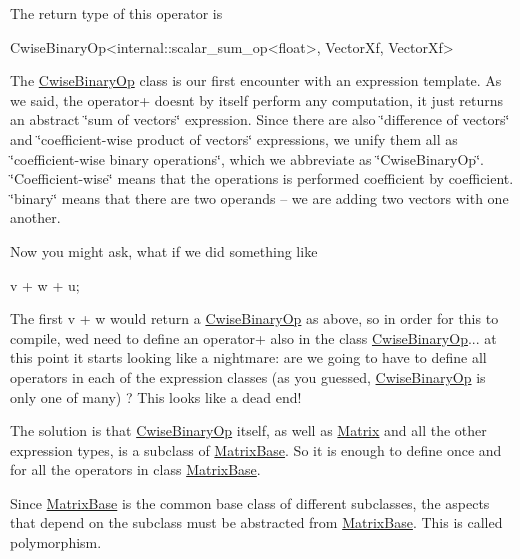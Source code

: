 The return type of this operator is 
\begin{DoxyCode}
CwiseBinaryOp<internal::scalar\_sum\_op<float>, VectorXf, VectorXf>
\end{DoxyCode}
 The \hyperlink{group___core___module_class_eigen_1_1_cwise_binary_op}{Cwise\+Binary\+Op} class is our first encounter with an expression template. As we said, the operator+ doesn\textquotesingle{}t by itself perform any computation, it just returns an abstract \char`\"{}sum of vectors\char`\"{} expression. Since there are also \char`\"{}difference of vectors\char`\"{} and \char`\"{}coefficient-\/wise product of vectors\char`\"{} expressions, we unify them all as \char`\"{}coefficient-\/wise binary operations\char`\"{}, which we abbreviate as \char`\"{}\+Cwise\+Binary\+Op\char`\"{}. \char`\"{}\+Coefficient-\/wise\char`\"{} means that the operations is performed coefficient by coefficient. \char`\"{}binary\char`\"{} means that there are two operands -- we are adding two vectors with one another.

Now you might ask, what if we did something like


\begin{DoxyCode}
v + w + u;
\end{DoxyCode}


The first v + w would return a \hyperlink{group___core___module_class_eigen_1_1_cwise_binary_op}{Cwise\+Binary\+Op} as above, so in order for this to compile, we\textquotesingle{}d need to define an operator+ also in the class \hyperlink{group___core___module_class_eigen_1_1_cwise_binary_op}{Cwise\+Binary\+Op}... at this point it starts looking like a nightmare\+: are we going to have to define all operators in each of the expression classes (as you guessed, \hyperlink{group___core___module_class_eigen_1_1_cwise_binary_op}{Cwise\+Binary\+Op} is only one of many) ? This looks like a dead end!

The solution is that \hyperlink{group___core___module_class_eigen_1_1_cwise_binary_op}{Cwise\+Binary\+Op} itself, as well as \hyperlink{group___core___module_class_eigen_1_1_matrix}{Matrix} and all the other expression types, is a subclass of \hyperlink{group___core___module_class_eigen_1_1_matrix_base}{Matrix\+Base}. So it is enough to define once and for all the operators in class \hyperlink{group___core___module_class_eigen_1_1_matrix_base}{Matrix\+Base}.

Since \hyperlink{group___core___module_class_eigen_1_1_matrix_base}{Matrix\+Base} is the common base class of different subclasses, the aspects that depend on the subclass must be abstracted from \hyperlink{group___core___module_class_eigen_1_1_matrix_base}{Matrix\+Base}. This is called polymorphism.


